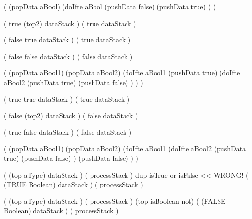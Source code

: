 \startImplementation[ansic]
  (
    (popData aBool)
    (doIfte aBool
      (pushData false)
      (pushData true)
    )
  )
\stopImplementation
\stopJoyLoLWord

\startJoyLoLWord[or]
\startRule[or-true1]
\preDataStack
  (
    true
    (top2)
    dataStack
  )
\postDataStack
  (
    true
    dataStack
  )
\stopRule

\startRule[or-true2]
\preDataStack
  (
    false
    true
    dataStack
  )
\postDataStack
  (
    true
    dataStack
  )
\stopRule

\startRule[or-false]
\preDataStack
  (
    false
    false
    dataStack
  )
\postDataStack
  (
    false
    dataStack
  )
\stopRule

\startImplementation[ansic]
  (
    (popData aBool1)
    (popData aBool2)
    (doIfte aBool1
      (pushData true)
      (doIfte aBool2
        (pushData true)
        (pushData false)
      )
    )
  )
\stopImplementation

\stopJoyLoLWord

\startJoyLoLWord[and]

\preDataStack
  (
    true
    true
    dataStack
  )
\postDataStack
  (
    true
    dataStack
  )
\stopRule

\preDataStack
  (
    false
    (top2)
    dataStack
  )
\postDataStack
  (
    false
    dataStack
  )
\stopRule

\preDataStack
  (
    true
    false
    dataStack
  )
\postDataStack
  (
    false
    dataStack
  )
\stopRule

\startImplementation[ansic]
  (
    (popData aBool1)
    (popData aBool2)
    (doIfte aBool1
      (doIfte aBool2
        (pushData true)
        (pushData false)
      )
      (pushData false)
    )
  )
\stopImplementation

\stopJoyLoLWord

\startJoyLoLWord[isBoolean]

\preDataStack
  (
    (top aType)
    dataStack
  )
\preProcessStack
  (
    processStack
  )
\preCondition
  dup isTrue or isFalse  << WRONG!
\postDataStack
  (
    (TRUE Boolean)
    dataStack
  )
\postProcessStack
  (
    processStack
  )
\stopRule

\preDataStack
  (
    (top aType)
    dataStack
  )
\preProcessStack
  (
    processStack
  )
\preCondition
  (top isBoolean not)
\postDataStack
  (
    (FALSE Boolean)
    dataStack
  )
\postProcessStack
  (
    processStack
  )
\stopRule

